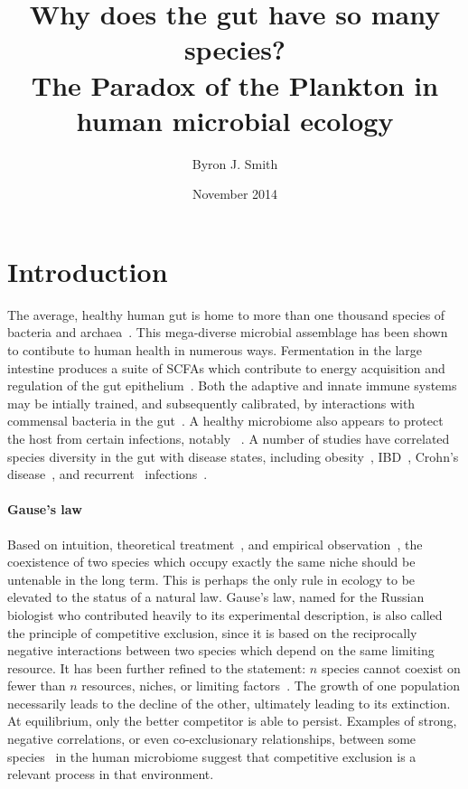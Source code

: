 \documentclass[12pt]{article}
\begin{document}
\title{\huge Why does the gut have so many species? \\
       {\Large The Paradox of the Plankton in human microbial ecology}}
\author{Byron J. Smith}
\date{November 2014}
\maketitle

\section{Introduction}
The average, healthy human gut is home to more than one thousand species of
bacteria and archaea~\citep{Claesson2009,Brestoff2013}.
This mega-diverse microbial assemblage has been shown to contibute to human
health in numerous ways.
Fermentation in the large intestine produces a suite of \glspl*{SCFA}
which contribute to energy acquisition and regulation of
the gut epithelium~\citep{TODO}.
Both the adaptive and innate immune systems may be intially trained,
and subsequently calibrated,
by interactions with commensal bacteria in the gut~\citep{TODO}.
A healthy microbiome also appears to protect the host from certain
infections, notably \cdiff~\citep{TODO}.
A number of studies have correlated species diversity in the gut
with disease states,
including obesity~\citep{TODO},
\gls*{IBD}~\citep{TODO},
Crohn's disease~\citep{Manichanh2006},
and recurrent \cdiff\ infections~\citep{Chang2008}.

\paragraph{Gause's law}
Based on intuition, theoretical
treatment~\citep{Lotka1925,Volterra1928,MacArthur1967a},
and empirical observation~\citep{Gause1932,Gause1936},
the coexistence of two species which occupy
exactly the same niche should be untenable in the long term.
This is perhaps the only rule in ecology to be elevated to the
status of a natural law.
Gause's law, named for the Russian biologist who contributed
heavily to its experimental description, is also called
the principle of competitive exclusion, since it is based on
the reciprocally negative interactions between two species which
depend on the same limiting resource.
It has been further refined to the statement: \(n\) species cannot coexist on
fewer than \(n\) resources, niches, or limiting
factors~\citep[various authors, for a review see][]{Armstrong1980}.
The growth of one population necessarily leads to the decline of
the other, ultimately leading to its extinction.
At equilibrium, only the better competitor is able to persist.
Examples of strong, negative correlations,
or even co-exclusionary relationships,
between some species~\citep{Faust2012a} in the human microbiome
suggest that competitive exclusion is a relevant process in that environment.
\end{document}
